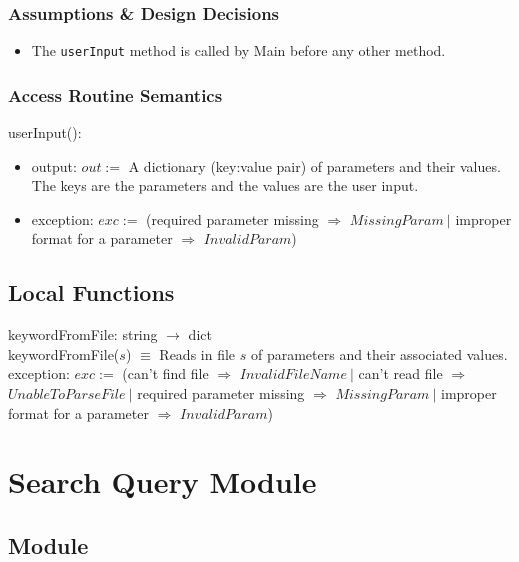 \documentclass{article}
\begin{document}
\subsubsection* {Assumptions \& Design Decisions}

\begin{itemize}
\item The \texttt{userInput} method is called by Main before any other method.
\end{itemize}

\subsubsection* {Access Routine Semantics}

\noindent userInput():
\begin{itemize}
\item output: $\mathit{out} :=$ A dictionary (key:value pair) of parameters and their values. The keys are the parameters and the values are the user input.
\item exception: $\mathit{exc} :=$ (required parameter missing $\Rightarrow$ $\mathit{MissingParam} ~\vert$ improper format for a parameter $\Rightarrow$ $\mathit{InvalidParam}$)
\end{itemize}

\subsection* {Local Functions}

keywordFromFile: string $\rightarrow$ dict \\
keywordFromFile($\mathit{s}$) $\equiv$ Reads in file $\mathit{s}$ of parameters and their associated values.\\
exception: $exc :=$ (can't find file $\Rightarrow$ $\mathit{InvalidFileName} ~\vert$ can't read file $\Rightarrow$ $\mathit{UnableToParseFile} ~\vert$ required parameter missing $\Rightarrow$ $\mathit{MissingParam} ~\vert$ improper format for a parameter $\Rightarrow$ $\mathit{InvalidParam}$)

\newpage

\section*{Search Query Module}

\subsection* {Module}
\end{document}
